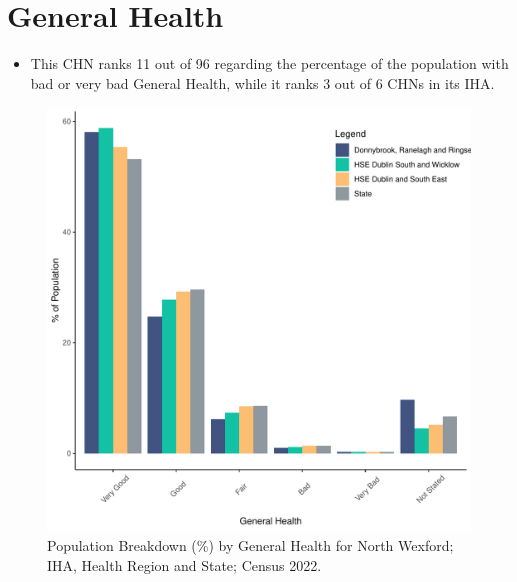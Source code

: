\documentclass{article}
\begin{document}
\pagebreak

\section{General Health}\label{sect:GenHealth}
\begin{itemize}
\item  This CHN ranks  11 out of 96 regarding the percentage of the population with bad or very bad General Health, while it ranks   3 out of 6 CHNs in its IHA.
\end{itemize}
\begin{figure}[h]
	\centering
	\includegraphics[width = 150mm]{../figures/GenED.pdf}
	\caption{Population Breakdown (\%) by General Health for North Wexford; IHA, Health Region and State;  Census 2022.}
	\label{fig:2ae19629-1a6a-13a3-e055-000000000001}
	\end{figure}
\end{document}
